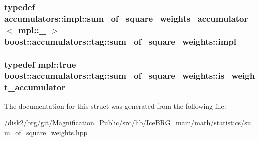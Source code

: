 \subsubsection[{impl}]{\setlength{\rightskip}{0pt plus 5cm}typedef {\bf accumulators\+::impl\+::sum\+\_\+of\+\_\+square\+\_\+weights\+\_\+accumulator}$<$ mpl\+::\+\_ $>$ {\bf boost\+::accumulators\+::tag\+::sum\+\_\+of\+\_\+square\+\_\+weights\+::impl}}\label{structboost_1_1accumulators_1_1tag_1_1sum__of__square__weights_a1b17755b77e02ad2286bcace0dcb9109}
\hypertarget{structboost_1_1accumulators_1_1tag_1_1sum__of__square__weights_aa1b4145dd1d30517a31fc2b139a4d831}{}
\subsubsection[{is\+\_\+weight\+\_\+accumulator}]{\setlength{\rightskip}{0pt plus 5cm}typedef mpl\+::true\+\_\+ {\bf boost\+::accumulators\+::tag\+::sum\+\_\+of\+\_\+square\+\_\+weights\+::is\+\_\+weight\+\_\+accumulator}}\label{structboost_1_1accumulators_1_1tag_1_1sum__of__square__weights_aa1b4145dd1d30517a31fc2b139a4d831}


The documentation for this struct was generated from the following file\+:\begin{DoxyCompactItemize}
\item 
/disk2/brg/git/\+Magnification\+\_\+\+Public/src/lib/\+Ice\+B\+R\+G\+\_\+main/math/statistics/\hyperlink{sum__of__square__weights_8hpp}{sum\+\_\+of\+\_\+square\+\_\+weights.\+hpp}\end{DoxyCompactItemize}

